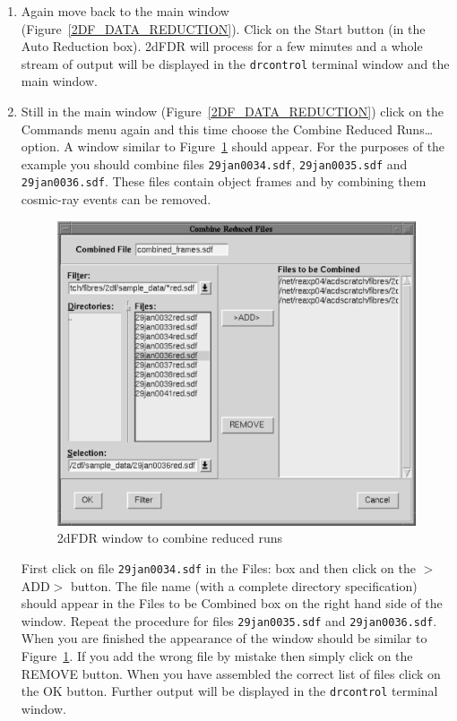 \documentclass[chapters,twoside,11pt]{starlink}
\begin{document}
\begin{enumerate}
  \item Again move back to the main window
   (Figure~\ref{2DF_DATA_REDUCTION}).  Click on the \textsf{Start}
   button (in the \textsf{Auto Reduction} box).  2dFDR will process for a
   few minutes and a whole stream of output will be displayed in the
   \texttt{drcontrol} terminal window and the main window.

  \item Still in the main window (Figure~\ref{2DF_DATA_REDUCTION})
   click on the \textsf{Commands} menu again and this time choose the
   \textsf{Combine Reduced Runs\ldots} option.  A window similar to
   Figure~\ref{2DF_COMBINE_RUNS} should appear.  For the purposes of
   the example you should combine files \texttt{29jan0034.sdf},
   \texttt{29jan0035.sdf} and \texttt{29jan0036.sdf}.  These files contain
   object frames and by combining them cosmic-ray events can be
   removed.

  \begin{figure}[htbp]
     \centering
     \includegraphics[totalheight=4in]{sc14_2df_combine_runs}
     \caption{2dFDR window to combine reduced runs
     \label{2DF_COMBINE_RUNS} }
  \end{figure}

   First click on file \texttt{29jan0034.sdf} in the \textsf{Files:} box and
   then click on the \textsf{$>$ADD$>$} button.  The file name (with a
   complete directory specification) should appear in the \textsf{Files
   to be Combined} box  on the right hand side of the window.  Repeat
   the procedure for files \texttt{29jan0035.sdf} and \texttt{29jan0036.sdf}.
   When you are finished the appearance of the window should be similar
   to Figure~\ref{2DF_COMBINE_RUNS}.  If you add the wrong file by
   mistake then simply click on the \textsf{REMOVE} button.  When you have
   assembled the correct list of files click on the \textsf{OK} button.
   Further output will be displayed in the \texttt{drcontrol} terminal window.


\end{enumerate}
\end{document}

